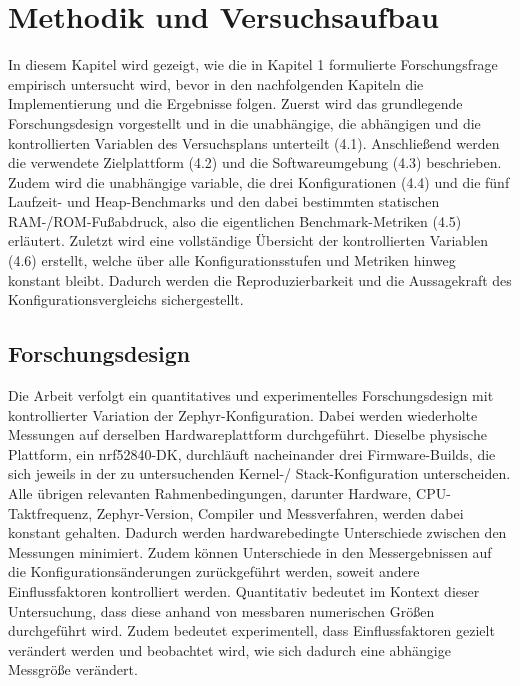 \chapter{Methodik und Versuchsaufbau}
\label{ch:methodik-und-versuchsaufbau}

In diesem Kapitel wird gezeigt, wie die in Kapitel 1 formulierte Forschungsfrage empirisch untersucht wird, bevor in den nachfolgenden Kapiteln die Implementierung und die Ergebnisse folgen. Zuerst wird das grundlegende Forschungsdesign vorgestellt und in die unabh{\"a}ngige, die abh{\"a}ngigen und die kontrollierten Variablen des Versuchsplans unterteilt (4.1). Anschlie{\ss}end werden die verwendete Zielplattform (4.2) und die Softwareumgebung (4.3) beschrieben. Zudem wird die unabh{\"a}ngige variable, die drei Konfigurationen (4.4) und die f{\"u}nf Laufzeit- und Heap-Benchmarks und den dabei bestimmten statischen RAM-/ROM-Fu{\ss}abdruck, also die eigentlichen Benchmark-Metriken (4.5) erl{\"a}utert. Zuletzt wird eine vollst{\"a}ndige {\"U}bersicht der kontrollierten Variablen (4.6) erstellt, welche {\"u}ber alle Konfigurationsstufen und Metriken hinweg konstant bleibt. Dadurch werden die Reproduzierbarkeit und die Aussagekraft des Konfigurationsvergleichs sichergestellt.

\section{Forschungsdesign}
Die Arbeit verfolgt ein quantitatives und experimentelles Forschungsdesign mit kontrollierter Variation der Zephyr-Konfiguration. Dabei werden wiederholte Messungen auf derselben Hardwareplattform durchgef{\"u}hrt. Dieselbe physische Plattform, ein nrf52840-DK, durchl{\"a}uft nacheinander drei Firmware-Builds, die sich jeweils in der zu untersuchenden Kernel-/ Stack-Konfiguration unterscheiden. Alle {\"u}brigen relevanten Rahmenbedingungen, darunter Hardware, CPU-Taktfrequenz, Zephyr-Version, Compiler und Messverfahren, werden dabei konstant gehalten. Dadurch werden hardwarebedingte Unterschiede zwischen den Messungen minimiert. Zudem k{\"o}nnen Unterschiede in den Messergebnissen auf die Konfigurations{\"a}nderungen zur{\"u}ckgef{\"u}hrt werden, soweit andere Einflussfaktoren kontrolliert werden. Quantitativ bedeutet im Kontext dieser Untersuchung, dass diese anhand von messbaren numerischen Gr{\"o}{\ss}en durchgef{\"u}hrt wird. Zudem bedeutet experimentell, dass Einflussfaktoren gezielt ver{\"a}ndert werden und beobachtet wird, wie sich dadurch eine abh{\"a}ngige Messgr{\"o}{\ss}e ver{\"a}ndert.


